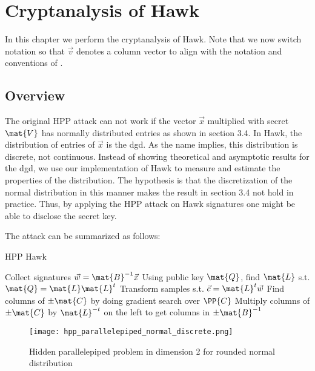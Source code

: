 \chapter{Cryptanalysis of Hawk}
In this chapter we perform the cryptanalysis of Hawk. Note that we now switch notation so that $\vec{v}$ denotes a column vector to align with the notation and conventions of \cite{HawkSpec24}.
\section{Overview}

The original HPP attack can not work if the vector $\vec{x}$ multiplied with secret $\mat{V}$ has normally distributed entries as shown in section 3.4.
In Hawk, the distribution of entries of $\vec{x}$ is the \gls{dgd}. As the name implies, this distribution is discrete, not continuous. 
Instead of showing theoretical and asymptotic results for the \gls{dgd}, we use our implementation of Hawk to measure and estimate the properties of the distribution.
The hypothesis is that the discretization of the normal distribution in this manner makes the result in section 3.4 not hold in practice. 
Thus, by applying the HPP attack on Hawk signatures one might be able to disclose the secret key.

The attack can be summarized as follows: 
\begin{algorithm}
\caption{HPP Hawk}
\begin{algorithmic}[1]
        \State Collect signatures $\vec{w} = \mat{B}^{-1} \vec{x}$
        \State Using public key $\mat{Q}$, find $\mat{L}$ s.t. $\mat{Q} = \mat{L} \mat{L}^t$
        \State Transform samples s.t. $\vec{c} = \mat{L}^t \vec{w}$
        \State Find columns of $\pm \mat{C}$ by doing gradient search over $\PP{C}$
        \State Multiply columns of $\pm \mat{C}$ by $\mat{L}^{-t}$ on the left to get columns in $\pm \mat{B}^{-1}$
\end{algorithmic}
\end{algorithm}

\begin{figure}[H]
    \centering
    \texttt{[image: hpp\_parallelepiped\_normal\_discrete.png]}
    \caption{Hidden parallelepiped problem in dimension 2 for rounded normal distribution}
  	\medskip 
    \label{parallelepiped_normal_discrete}
\end{figure}

